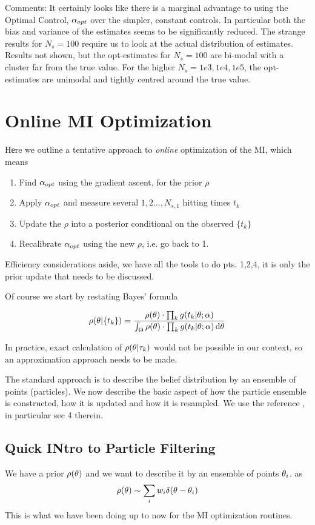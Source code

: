 Comments: It certainly looks like there is a marginal advantage to using the 
Optimal Control, $\alpha_{opt}$ over the simpler, constant controls. In particular
both the bias and variance of the estimates seems to be significantly reduced.
The strange results for $N_s = 100$ require us to look at the actual
distribution of estimates. Results not shown, but the opt-estimates for
$N_s=100$ are bi-modal with a cluster far from the true value. For the higher
$N_s = 1e3,1e4, 1e5$, the opt-estimates are unimodal and tightly centred
around the true value.


\clearpage

\section{Online MI Optimization}
Hеre we outline a tentative approach to {\sl online} optimization of the MI,
which means

\begin{enumerate}
  \item Find ${\alpha_{opt} }$ using the gradient ascent, for the prior $\rho$
  \item Apply ${\alpha_{opt} }$ and measure several $1,2\ldots,N_{s,1}$ hitting times
  $t_k$
  \item Update the $\rho$ into a posterior conditional on the observed $\{t_k\}$
  \item Recalibrate ${\alpha_{opt} }$ using the new $\rho$, i.e. go back to 1. 
\end{enumerate}

 Efficiency considerations aside, we have all the tools to do pts. 1,2,4, it
 is only the prior update that needs to be discussed. 

Of course we start by restating Bayes' formula

$$
\rho({ \theta}| \{t_k\} ) = 
\frac{  \rho({ \theta}) \cdot \prod_k g(t_k|{ \theta} ; \alpha) }
	 { \int_{\Theta}  \rho({ \theta}) \cdot \prod_k g(t_k|{ \theta} ; \alpha)  \, \mathrm{d} { \theta}}
$$

In practice, exact calculation of $\rho({ \theta}|{\tau}_k)$ would not be possible in our
context, so an approximation approach needs to be made.

The standard approach is to describe the belief distribution by an ensemble of
points (particles). We now describe the basic aspect of how the particle
ensemble is constructed, how it is updated and how it is resampled. We use the
reference \cite{Granade2012}, in particular sec 4 therein.

\subsection{Quick INtro to Particle Filtering}
We have a prior
$ \rho({ \theta})$ and we want to describe it by an ensemble of points ${ \theta}_i$.
as 
$$ \rho({ \theta}) \sim \sum_i w_i \delta({ \theta}-{ \theta}_i)$$
This is what we have been doing up to now for the MI optimization routines.

